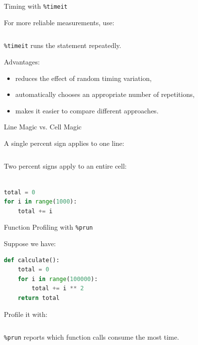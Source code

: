 \documentclass[aspectratio=43,10pt]{beamer}
\begin{document}
\begin{frame}[fragile]{Timing with \texttt{\%timeit}}

For more reliable measurements, use:

\begin{lstlisting}[language=Python]
%timeit sum(range(1000000))
\end{lstlisting}

\texttt{\%timeit} runs the statement repeatedly.

\vspace{0.3cm}

Advantages:

\begin{itemize}
  \item reduces the effect of random timing variation,
  \item automatically chooses an appropriate number of repetitions,
  \item makes it easier to compare different approaches.
\end{itemize}

\end{frame}

\begin{frame}[fragile]{Line Magic vs. Cell Magic}

A single percent sign applies to one line:

\begin{lstlisting}[language=Python]
%timeit sum(range(1000))
\end{lstlisting}

Two percent signs apply to an entire cell:

\begin{lstlisting}[language=Python]
%%timeit

total = 0
for i in range(1000):
    total += i
\end{lstlisting}

\end{frame}

\begin{frame}[fragile]{Function Profiling with \texttt{\%prun}}

Suppose we have:

\begin{lstlisting}[language=Python]
def calculate():
    total = 0
    for i in range(100000):
        total += i ** 2
    return total
\end{lstlisting}

Profile it with:

\begin{lstlisting}[language=Python]
%prun calculate()
\end{lstlisting}

\texttt{\%prun} reports which function calls consume the most time.

\end{frame}
\end{document}
